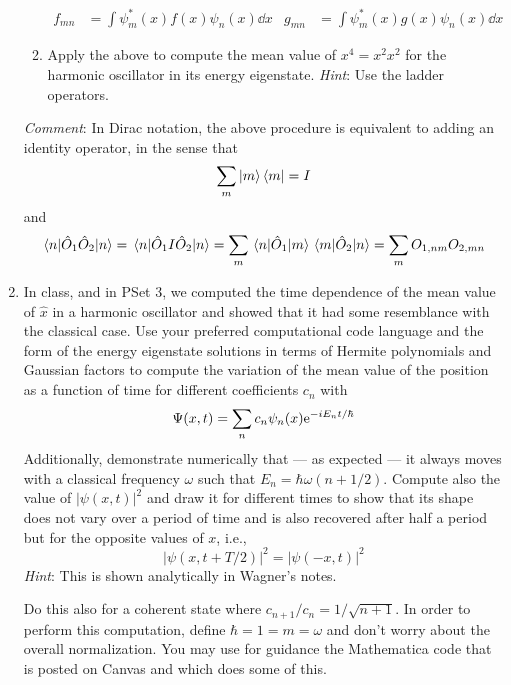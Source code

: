 \documentclass[../psets.tex]{subfiles}
\begin{document}
\begin{enumerate}
\begin{enumerate}
        \begin{align}
            f_{mn} &= \int\psi_m^*(x)f(x)\psi_n(x)\dd{x}&
            g_{mn} &= \int\psi_m^*(x)g(x)\psi_n(x)\dd{x}
        \end{align}
        \item Apply the above to compute the mean value of $x^4=x^2x^2$ for the harmonic oscillator in its energy eigenstate. \emph{Hint}: Use the ladder operators.
    \end{enumerate}
    \emph{Comment}: In Dirac notation, the above procedure is equivalent to adding an identity operator, in the sense that
    \begin{equation}
        \sum_m\ket{m}\bra{m} = I
    \end{equation}
    and
    \begin{equation}
        \ev{\hat{O}_1\hat{O}_2}{n} = \ev{\hat{O}_1I\hat{O}_2}{n}
        = \sum_m\mel{n}{\hat{O}_1}{m}\mel{m}{\hat{O}_2}{n}
        = \sum_mO_{1,nm}O_{2,mn}
    \end{equation}
    \item In class, and in PSet 3, we computed the time dependence of the mean value of $\hat{x}$ in a harmonic oscillator and showed that it had some resemblance with the classical case. Use your preferred computational code language and the form of the energy eigenstate solutions in terms of Hermite polynomials and Gaussian factors to compute the variation of the mean value of the position as a function of time for different coefficients $c_n$ with
    \begin{equation}
        \Psi(x,t) = \sum_nc_n\psi_n(x)\e[-iE_nt/\hbar]
    \end{equation}
    Additionally, demonstrate numerically that --- as expected --- it always moves with a classical frequency $\omega$ such that $E_n=\hbar\omega(n+1/2)$. Compute also the value of $|\psi(x,t)|^2$ and draw it for different times to show that its shape does not vary over a period of time and is also recovered after half a period but for the opposite values of $x$, i.e.,
    \begin{equation}
        |\psi(x,t+T/2)|^2 = |\psi(-x,t)|^2
    \end{equation}
    \emph{Hint}: This is shown analytically in Wagner's notes.\par
    Do this also for a coherent state where $c_{n+1}/c_n=1/\sqrt{n+1}$. In order to perform this computation, define $\hbar=1=m=\omega$ and don't worry about the overall normalization. You may use for guidance the Mathematica code that is posted on Canvas and which does some of this.
\end{enumerate}
\end{document}
